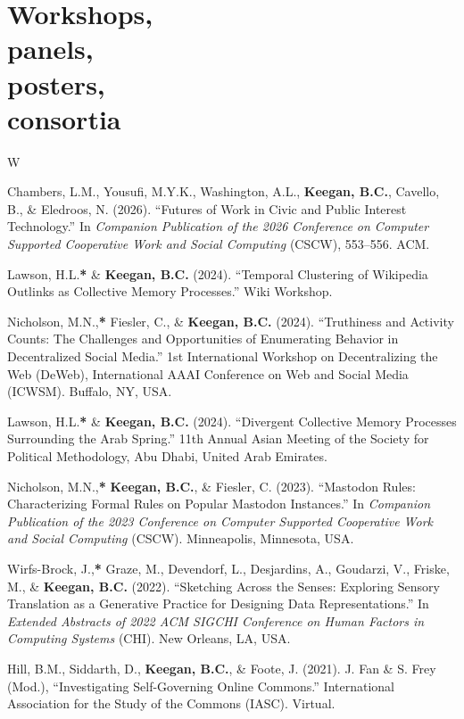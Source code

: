 \documentclass{cv}
\begin{document}
	\section{Workshops,\\ panels,\\posters,\\consortia}
	\begin{entries}{W}
		\item Chambers, L.M., Yousufi, M.Y.K., Washington, A.L., \textbf{Keegan, B.C.}, Cavello, B., \& Eledroos, N. (2026). ``Futures of Work in Civic and Public Interest Technology.'' In \textit{Companion Publication of the 2026 Conference on Computer Supported Cooperative Work and Social Computing} (CSCW), 553--556. ACM. 
		\item Lawson, H.L.\textbf{*} \& \textbf{Keegan, B.C.} (2024). ``Temporal Clustering of Wikipedia Outlinks as Collective Memory Processes.'' Wiki Workshop.
		\item Nicholson, M.N.,\textbf{*} Fiesler, C., \& \textbf{Keegan, B.C.} (2024). ``Truthiness and Activity Counts: The Challenges and Opportunities of Enumerating Behavior in Decentralized Social Media.'' 1st International Workshop on Decentralizing the Web (DeWeb), International AAAI Conference on Web and Social Media (ICWSM). Buffalo, NY, USA.
		\item Lawson, H.L.\textbf{*} \& \textbf{Keegan, B.C.} (2024). ``Divergent Collective Memory Processes Surrounding the Arab Spring.'' 11th Annual Asian Meeting of the Society for Political Methodology, Abu Dhabi, United Arab Emirates.
		\item Nicholson, M.N.,\textbf{*} \textbf{Keegan, B.C.}, \& Fiesler, C. (2023). ``Mastodon Rules: Characterizing Formal Rules on Popular Mastodon Instances.'' In \textit{Companion Publication of the 2023 Conference on Computer Supported Cooperative Work and Social Computing} (CSCW). Minneapolis, Minnesota, USA. 
		\item Wirfs-Brock, J.,\textbf{*} Graze, M., Devendorf, L., Desjardins, A., Goudarzi, V., Friske, M., \& \textbf{Keegan, B.C.} (2022). ``Sketching Across the Senses: Exploring Sensory Translation as a Generative Practice for Designing Data Representations.'' In \textit{Extended Abstracts of 2022 ACM SIGCHI Conference on Human Factors in Computing Systems} (CHI). New Orleans, LA, USA. 
		\item Hill, B.M., Siddarth, D., \textbf{Keegan, B.C.}, \& Foote, J. (2021). J. Fan \& S. Frey (Mod.), ``Investigating Self-Governing Online Commons.'' International Association for the Study of the Commons (IASC). Virtual.

\end{entries}
\end{document}

